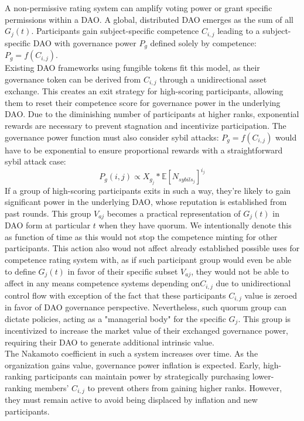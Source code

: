 \documentclass{article}
\begin{document}
\begin{CJK}{UTF8}{gbsn}
\begin{multicols}{2}
        A non-permissive rating system can amplify voting power or grant specific permissions within a DAO. A global, distributed DAO emerges as the sum of all $G_j(t)$. Participants gain subject-specific competence $C_{i,j}$ leading to a subject-specific DAO with governance power $P_g$ defined solely by competence: $P_g = f(C_{i,j})$. \\
        Existing DAO frameworks using fungible tokens fit this model, as their governance token can be derived from $C_{i,j}$ through a unidirectional asset exchange. This creates an exit strategy for high-scoring participants, allowing them to reset their competence score for governance power in the underlying DAO.
        Due to the diminishing number of participants at higher ranks, exponential rewards are necessary to prevent stagnation and incentivize participation. The governance power function must also consider sybil attacks: $P_g = f(C_{i,j})$ would have to be exponential to ensure proportional rewards with a straightforward sybil attack case: $$P_g(i,j) \propto  X_{g_j}*\mathbb{E}[N_{sybils_j}]^{i_j}$$
        If a group of high-scoring participants exits in such a way, they're likely to gain significant power in the underlying DAO, whose reputation is established from past rounds. This group $V_{aj}$ becomes a practical representation of $G_j(t)$ in DAO form at particular $t$ when they have quorum. We intentionally denote this as function of time as this would not stop the competence minting for other participants. This action also woud not affect already established possible uses for competence rating system with, as if such participant group would even be able to define $G_j(t)$ in favor of their specific subset $V_{aj}$, they would not be able to affect in any means competence systems depending on$C _{i,j}$ due to unidirectional control flow with exception of the fact that these participants $C_{i,j}$ value is zeroed in favor of DAO governance perspective.
        Nevertheless, such quorum group can dictate policies, acting as a "managerial body" for the specific $G_j$. This group is incentivized to increase the market value of their exchanged governance power, requiring their DAO to generate additional intrinsic value. \\
        The Nakamoto coefficient in such a system increases over time. As the organization gains value, governance power inflation is expected. Early, high-ranking participants can maintain power by strategically purchasing lower-ranking members' $C_{i,j}$ to prevent others from gaining higher ranks. However, they must remain active to avoid being displaced by inflation and new participants.



\end{multicols}
\end{CJK}
\end{document}
